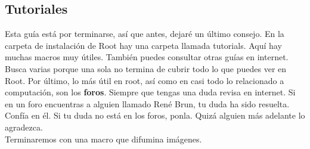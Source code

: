 \documentclass{article}
\begin{document}
\subsection{Tutoriales}

Esta gu\'ia est\'a por terminarse, as\'i que antes, dejar\'e un \'ultimo consejo. En la carpeta de instalaci\'on de Root hay una carpeta llamada tutorials. Aqu\'i hay muchas macros muy \'utiles. Tambi\'en puedes consultar otras gu\'ias en internet. Busca varias porque una sola no termina de cubrir todo lo que puedes ver en Root. Por \'ultimo, lo m\'as \'util en root, as\'i como en casi todo lo relacionado a computaci\'on, son los \textbf{foros}. Siempre que tengas una duda revisa en internet. Si en un foro encuentras a alguien llamado Ren\'e Brun, tu duda ha sido resuelta. Conf\'ia en \'el. Si tu duda no est\'a en los foros, ponla. Quiz\'a alguien m\'as adelante lo agradezca.\\
Terminaremos con una macro que difumina im\'agenes.
\end{document}
